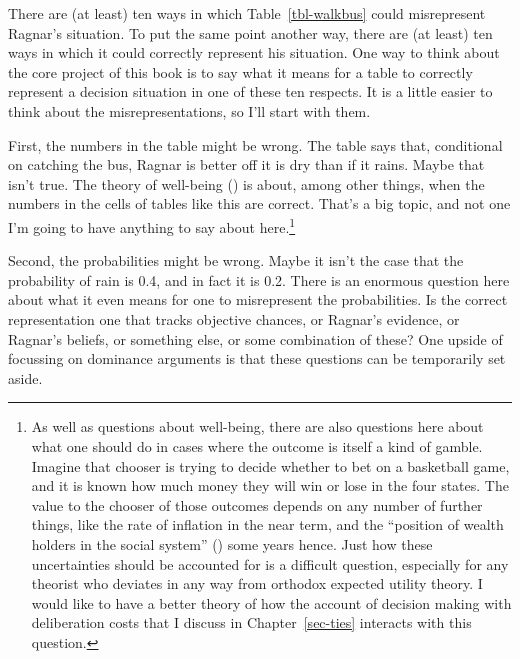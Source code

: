 \documentclass[
  10pt,
  letterpaper,
  twoside]{scrbook}
\begin{document}
There are (at least) ten ways in which Table~\ref{tbl-walkbus} could
misrepresent Ragnar's situation. To put the same point another way,
there are (at least) ten ways in which it could correctly represent his
situation. One way to think about the core project of this book is to
say what it means for a table to correctly represent a decision
situation in one of these ten respects. It is a little easier to think
about the misrepresentations, so I'll start with them.

First, the numbers in the table might be wrong. The table says that,
conditional on catching the bus, Ragnar is better off it is dry than if
it rains. Maybe that isn't true. The theory of well-being
() is about, among other
things, when the numbers in the cells of tables like this are correct.
That's a big topic, and not one I'm going to have anything to say about
here.\footnote{As well as questions about well-being, there are also
  questions here about what one should do in cases where the outcome is
  itself a kind of gamble. Imagine that chooser is trying to decide
  whether to bet on a basketball game, and it is known how much money
  they will win or lose in the four states. The value to the chooser of
  those outcomes depends on any number of further things, like the rate
  of inflation in the near term, and the ``position of wealth holders in
  the social system'' ()
  some years hence. Just how these uncertainties should be accounted for
  is a difficult question, especially for any theorist who deviates in
  any way from orthodox expected utility theory. I would like to have a
  better theory of how the account of decision making with deliberation
  costs that I discuss in Chapter~\ref{sec-ties} interacts with this
  question.}

Second, the probabilities might be wrong. Maybe it isn't the case that
the probability of rain is 0.4, and in fact it is 0.2. There is an
enormous question here about what it even means for one to misrepresent
the probabilities. Is the correct representation one that tracks
objective chances, or Ragnar's evidence, or Ragnar's beliefs, or
something else, or some combination of these? One upside of focussing on
dominance arguments is that these questions can be temporarily set
aside.
\end{document}
